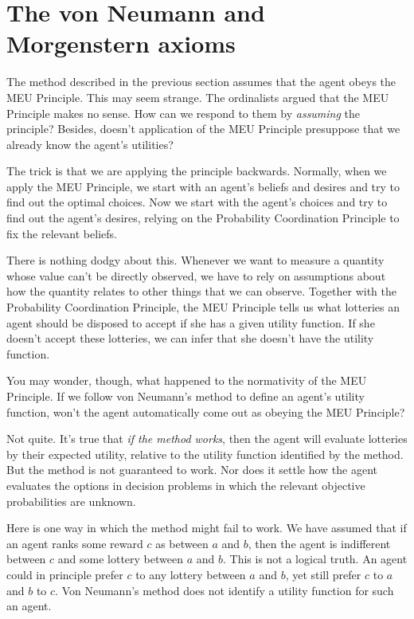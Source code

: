 \section{The von Neumann and Morgenstern axioms}\label{sec:vnm}

The method described in the previous section assumes that the agent obeys the
MEU Principle. This may seem strange. The ordinalists argued that the MEU
Principle makes no sense. How can we respond to them by \emph{assuming} the
principle? Besides, doesn't application of the MEU Principle presuppose that we
already know the agent's utilities?

The trick is that we are applying the principle backwards. Normally, when we
apply the MEU Principle, we start with an agent's beliefs and desires and try to
find out the optimal choices. Now we start with the agent's choices and try to
find out the agent's desires, relying on the Probability Coordination Principle
to fix the relevant beliefs.

There is nothing dodgy about this. Whenever we want to measure a quantity whose
value can't be directly observed, we have to rely on assumptions about how the
quantity relates to other things that we can observe. Together with the
Probability Coordination Principle, the MEU Principle tells us what lotteries
an agent should be disposed to accept if she has a given utility function. If
she doesn't accept these lotteries, we can infer that she doesn't have the
utility function.

You may wonder, though, what happened to the normativity of the MEU Principle.
If we follow von Neumann's method to define an agent's utility function, won't
the agent automatically come out as obeying the MEU Principle?

Not quite. It's true that \emph{if the method works}, then the agent will
evaluate lotteries by their expected utility, relative to the utility function
identified by the method. But the method is not guaranteed to work. Nor does it
settle how the agent evaluates the options in decision problems in which the
relevant objective probabilities are unknown.

Here is one way in which the method might fail to work. We have assumed that if
an agent ranks some reward $c$ as between $a$ and $b$, then the agent is
indifferent between $c$ and some lottery between $a$ and $b$. This is not a
logical truth. An agent could in principle prefer $c$ to any lottery between $a$
and $b$, yet still prefer $c$ to $a$ and $b$ to $c$. Von Neumann's method does
not identify a utility function for such an agent.

